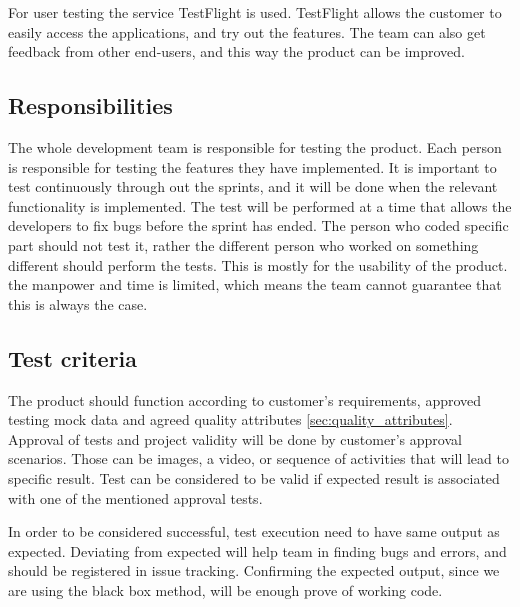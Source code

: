 For user testing the service TestFlight is used. TestFlight allows the customer to easily access the applications, and try out the features. The team can also get feedback from other end-users, and this way the product can be improved.  


\subsection{Responsibilities}
The whole development team is responsible for testing the product. 
Each person is responsible for testing the features they have implemented. It is important to test continuously through out the sprints, and it will be done when the relevant functionality is implemented. The test will be performed at a time that allows the developers to fix bugs before the sprint has ended.
The person who coded specific part should not test it, rather the different person who worked on something different should perform the tests. 
This is mostly for the usability of the product. the manpower and time is limited, which means the team cannot guarantee that this is always the case.
 

\subsection{Test criteria} 

The product should function according to customer's requirements, approved testing mock data and agreed quality attributes  \ref{sec:quality_attributes}.
Approval of tests and project validity will be done by customer's approval scenarios. 
Those can be images, a video, or sequence of activities that will lead to specific result. 
Test can be considered to be valid if expected result is associated with one of the mentioned approval tests.

In order to be considered successful, test execution need to have same output as expected. 
Deviating from expected will help team in finding bugs and errors, and should be registered in issue tracking.
Confirming the expected output, since we are using the black box method, will be enough prove of working code.

